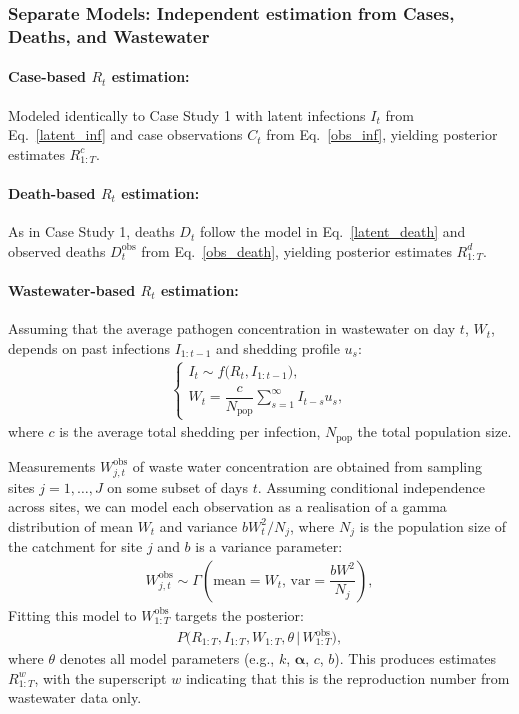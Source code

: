 \documentclass{article}
\begin{document}
\subsubsection{Separate Models: Independent estimation from Cases, Deaths, and Wastewater}

\paragraph{Case-based $R_t$ estimation:}  
Modeled identically to Case Study 1 with latent infections $I_t$ from Eq.~\eqref{latent_inf} and case observations $C_t$ from  Eq.~\eqref{obs_inf}, yielding posterior estimates $R_{1:T}^c$.

\paragraph{Death-based $R_t$ estimation:}  
As in Case Study 1, deaths $D_t$ follow the model in Eq.~\eqref{latent_death} and observed deaths $D^{\text{obs}}_t$ from  Eq.~\eqref{obs_death}, yielding posterior estimates $R_{1:T}^d$.

\paragraph{Wastewater-based $R_t$ estimation:}  
Assuming that the average pathogen concentration in wastewater on day $t$, $W_t$, depends on past infections $I_{1:t-1}$ and shedding profile $u_s$:
\begin{align}
\begin{cases}
I_t \sim f\big(R_t, I_{1:t-1}\big),\\[4pt]
W_t =\dfrac{c}{N_{\mathrm{pop}}} \sum_{s=1}^\infty I_{t-s} u_s ,
\end{cases}
\end{align}
where $c$ is the average total shedding per infection, $N_{\mathrm{pop}}$ the total population size. 

Measurements $W^{\text{obs}}_{j,t}$ of waste water concentration are obtained from sampling sites $j=1,\ldots,J$ on some subset of days $t$.  Assuming conditional independence across sites, we can model each observation as a realisation  of a gamma distribution of  mean $W_t$ and variance $b W_t^2/N_j$, where $N_j$ is the population size of the catchment for site $j$ and $b$ is a variance parameter:
\begin{align}
W^{\text{obs}}_{j,t} \sim \Gamma\left(\text{mean}= W_t,\,\text{var}=\dfrac{bW^2}{N_j}\right),
\end{align}
Fitting this model to $W^{\text{obs}}_{1:T}$ targets the posterior:
\begin{align}
P\big(R_{1:T}, I_{1:T}, W_{1:T}, \theta \,\big|\, W^{\text{obs}}_{1:T}\big),
\end{align}
where $\theta$ denotes all model parameters (e.g., $k$, $\boldsymbol{\alpha}$, $c$, $b$).  This produces estimates $R_{1:T}^w$, with the superscript $w$ indicating that this is the reproduction number from wastewater data only. 
\end{document}
